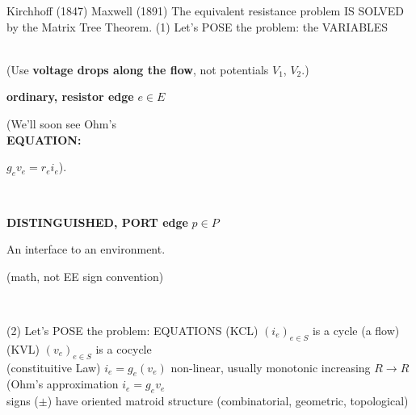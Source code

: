 \documentclass{beamer}
\begin{document}
\begin{frame}{Kirchhoff (1847)
\cite{Kirchhoff}
 Maxwell (1891)
\cite{MaxR} 
The equivalent resistance problem IS SOLVED
by the Matrix Tree Theorem. (1) Let's POSE the problem: the VARIABLES}

\begin{minipage}{.48\textwidth}
\\
(Use \textbf{voltage drops along the flow}, 
not potentials $V_1$, $V_2$.)\\
\begin{center}\textbf{ordinary, resistor edge} $e\in E$
\end{center}

(We'll soon see Ohm's\\
\textbf{EQUATION:}
\begin{center}$g_ev_e=r_ei_e$).
\end{center}

\end{minipage}
\begin{minipage}{.48\textwidth}
\\
\begin{center}\textbf{DISTINGUISHED, PORT edge} $p\in P$
\end{center}
An interface to an environment.
\begin{center}(math, not EE 
sign convention)
\end{center}
\end{minipage}\\
\end{frame}

\begin{frame}{(2) Let's POSE the problem: EQUATIONS}
(KCL) $(i_e)_{e\in S}$ is a cycle (a flow)\\
(KVL) $(v_e)_{e\in S}$ is a cocycle\\
(constituitive Law) $i_e=g_e(v_e)$
non-linear, usually monotonic increasing $R\rightarrow R$ 
(Ohm's approximation $i_e=g_ev_e$\\
signs ($\pm$) have oriented matroid structure
(combinatorial, geometric, topological)\\
\end{frame}
\end{document}
